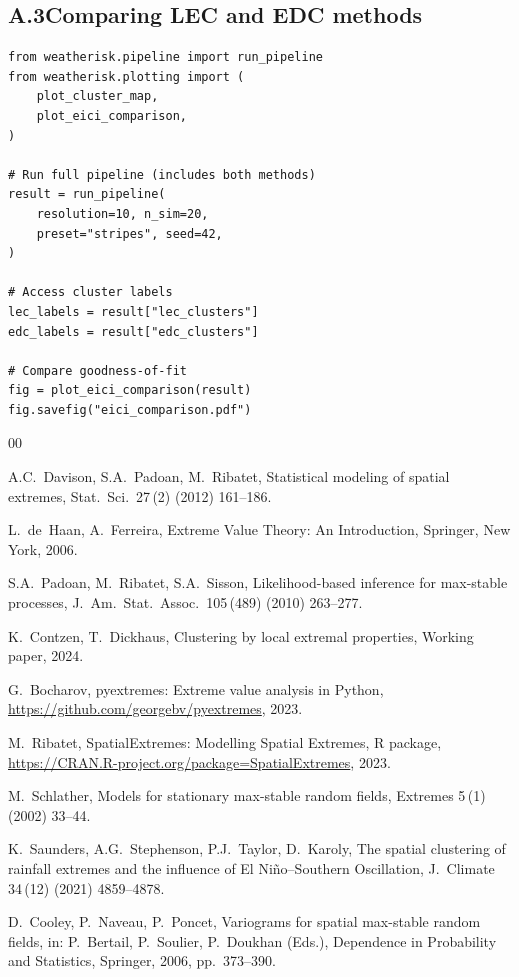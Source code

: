 \documentclass[preprint,12pt,a4paper]{elsarticle}
\begin{document}
\subsection{A.3\quad Comparing LEC and EDC methods}

\begin{lstlisting}[caption={Running both clustering methods
  and comparing results.}, label=lst:app-compare]
from weatherisk.pipeline import run_pipeline
from weatherisk.plotting import (
    plot_cluster_map,
    plot_eici_comparison,
)

# Run full pipeline (includes both methods)
result = run_pipeline(
    resolution=10, n_sim=20,
    preset="stripes", seed=42,
)

# Access cluster labels
lec_labels = result["lec_clusters"]
edc_labels = result["edc_clusters"]

# Compare goodness-of-fit
fig = plot_eici_comparison(result)
fig.savefig("eici_comparison.pdf")
\end{lstlisting}

\begin{thebibliography}{00}

A.C.~Davison, S.A.~Padoan, M.~Ribatet,
Statistical modeling of spatial extremes,
Stat.\ Sci.\ 27\,(2) (2012) 161--186.

L.~de~Haan, A.~Ferreira,
Extreme Value Theory: An Introduction,
Springer, New York, 2006.

S.A.~Padoan, M.~Ribatet, S.A.~Sisson,
Likelihood-based inference for max-stable processes,
J.\ Am.\ Stat.\ Assoc.\ 105\,(489) (2010) 263--277.

K.~Contzen, T.~Dickhaus,
Clustering by local extremal properties,
Working paper, 2024.

G.~Bocharov,
pyextremes: Extreme value analysis in Python,
\url{https://github.com/georgebv/pyextremes}, 2023.

M.~Ribatet,
SpatialExtremes: Modelling Spatial Extremes,
R package, \url{https://CRAN.R-project.org/package=SpatialExtremes}, 2023.

M.~Schlather,
Models for stationary max-stable random fields,
Extremes 5\,(1) (2002) 33--44.

K.~Saunders, A.G.~Stephenson, P.J.~Taylor, D.~Karoly,
The spatial clustering of rainfall extremes and the influence of
El Ni\~{n}o--Southern Oscillation,
J.\ Climate 34\,(12) (2021) 4859--4878.

D.~Cooley, P.~Naveau, P.~Poncet,
Variograms for spatial max-stable random fields,
in: P.~Bertail, P.~Soulier, P.~Doukhan (Eds.),
Dependence in Probability and Statistics,
Springer, 2006, pp.~373--390.

\end{thebibliography}
\end{document}
